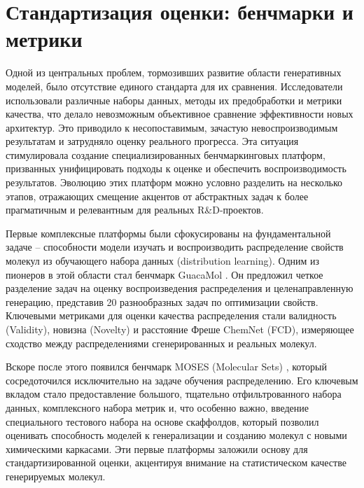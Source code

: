 
\section{Стандартизация оценки: бенчмарки и метрики}
\label{sec:standardization}

Одной из центральных проблем, тормозивших развитие области генеративных моделей, было отсутствие единого стандарта для их сравнения. Исследователи использовали различные наборы данных, методы их предобработки и метрики качества, что делало невозможным объективное сравнение эффективности новых архитектур. Это приводило к несопоставимым, зачастую невоспроизводимым результатам и затрудняло оценку реального прогресса. Эта ситуация стимулировала создание специализированных бенчмаркинговых платформ, призванных унифицировать подходы к оценке и обеспечить воспроизводимость результатов. Эволюцию этих платформ можно условно разделить на несколько этапов, отражающих смещение акцентов от абстрактных задач к более прагматичным и релевантным для реальных R&D-проектов.


Первые комплексные платформы были сфокусированы на фундаментальной задаче -- способности модели изучать и воспроизводить распределение свойств молекул из обучающего набора данных (distribution learning). Одним из пионеров в этой области стал бенчмарк GuacaMol \cite{brown2019guacamol}. Он предложил четкое разделение задач на оценку воспроизведения распределения и целенаправленную генерацию, представив 20 разнообразных задач по оптимизации свойств. Ключевыми метриками для оценки качества распределения стали валидность (Validity), новизна (Novelty) и расстояние Фреше ChemNet (FCD), измеряющее сходство между распределениями сгенерированных и реальных молекул.

Вскоре после этого появился бенчмарк MOSES (Molecular Sets) \cite{polykovskiy2020molecular}, который сосредоточился исключительно на задаче обучения распределению. Его ключевым вкладом стало предоставление большого, тщательно отфильтрованного набора данных, комплексного набора метрик и, что особенно важно, введение специального тестового набора на основе скаффолдов, который позволил оценивать способность моделей к генерализации и созданию молекул с новыми химическими каркасами. Эти первые платформы заложили основу для стандартизированной оценки, акцентируя внимание на статистическом качестве генерируемых молекул.

